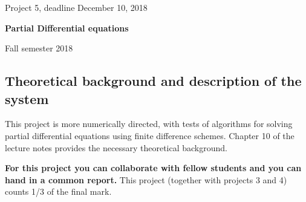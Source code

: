 \documentclass[%
oneside,                 %
final,                   %
10pt]{article}
\begin{document}

\newcommand{\exercisesection}[1]{\subsection*{#1}}






\thispagestyle{empty}

\begin{center}
{\LARGE\bf
\begin{spacing}{1.25}
Project 5, deadline  December 10, 2018
\end{spacing}
}
\end{center}


\begin{center}
{\bf Partial Differential equations${}^{}$} \\ [0mm]
\end{center}

\begin{center}
\end{center}
    

\begin{center}
Fall semester 2018
\end{center}

\vspace{1cm}


\subsection*{Theoretical background and description of the system}

This project is more numerically directed, with tests
of algorithms for solving partial differential equations using finite difference schemes. 
Chapter 10 of the lecture notes provides the necessary theoretical background.

\textbf{For this project you can collaborate with fellow students and you can  hand in a common report.}
This project (together with projects 3 and 4) counts 1/3 of the final mark.
\end{document}
